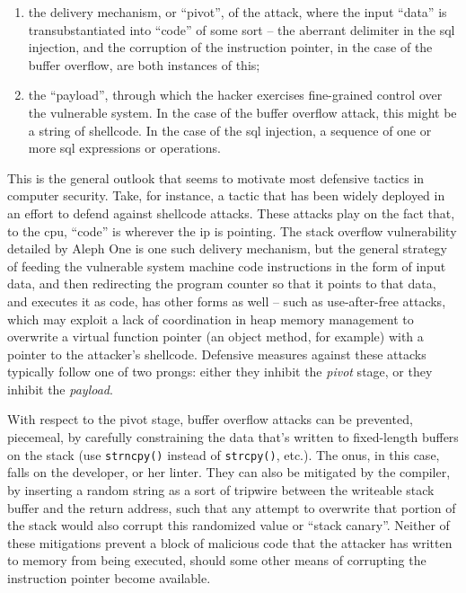 \documentclass[12pt,glossary]{dalthesis}
\begin{document}
\begin{enumerate}
\item the delivery mechanism, or ``pivot'', of the attack, where the input
``data'' is transubstantiated into ``code'' of some sort -- the aberrant delimiter in the \gls{sql}
injection, and the corruption of the instruction pointer, in the case of the
buffer overflow, are both instances of this;

\item the ``payload'', through which the hacker exercises fine-grained control
over the vulnerable system. In the case of the buffer overflow attack, this
might be a string of shellcode. In the case of the \gls{sql} injection, a sequence of
one or more \gls{sql} expressions or operations.
\end{enumerate}

This is the general outlook that seems to motivate most defensive tactics in
computer security. Take, for instance, a tactic that has been widely deployed in
an effort to defend against shellcode attacks. These attacks play on the fact
that, to the \gls{cpu}, ``code'' is wherever the \gls{ip} is pointing. The
stack overflow vulnerability detailed by Aleph One is one such delivery
mechanism, but the general strategy of feeding the vulnerable system machine
code instructions in the form of input data, and then redirecting the program
counter so that it points to that data, and executes it as code, has other forms
as well -- such as use-after-free attacks, which may exploit a lack of
coordination in heap memory management to overwrite a virtual function pointer
(an object method, for example) with a pointer to the attacker's shellcode.
Defensive measures against these attacks typically follow one of two
prongs: either they inhibit the \emph{pivot} stage, or they 
inhibit the \emph{payload}.

With respect to the pivot stage, buffer overflow attacks can be prevented,
piecemeal, by carefully constraining the data that's written to fixed-length
buffers on the stack (use \texttt{strncpy()} instead of \texttt{strcpy()}, etc.). The onus,
in this case, falls on the developer, or her linter. They can
also be mitigated by the compiler, by inserting a random string as a sort of
tripwire between the writeable stack buffer and the return address, such that
any attempt to overwrite that portion of the stack would also corrupt this
randomized value or ``stack canary''. Neither of these mitigations prevent a block
of malicious code that the attacker has written to memory from being executed,
should some other means of corrupting the instruction pointer become available.
\end{document}
